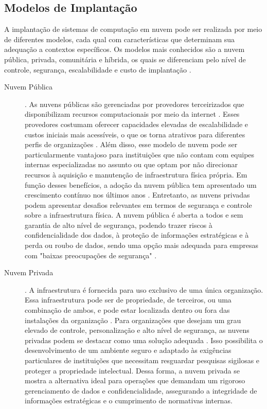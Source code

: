 \subsection{Modelos de Implantação}

A implantação de sistemas de computação em nuvem pode ser realizada por meio de diferentes modelos, cada qual com características que determinam sua adequação a contextos específicos. Os modelos mais conhecidos são a nuvem pública, privada, comunitária e híbrida, os quais se diferenciam pelo nível de controle, segurança, escalabilidade e custo de implantação \cite{mell2011}.

\begin{description}
    \item[Nuvem Pública]. As nuvens públicas são gerenciadas por provedores terceirizados que disponibilizam recursos computacionais por meio da internet \cite{carroll2011}. Esses provedores costumam oferecer capacidades elevadas de escalabilidade e custos iniciais mais acessíveis, o que os torna atrativos para diferentes perfis de organizações \cite{amajuoyi2024}. Além disso, esse modelo de nuvem pode ser particularmente vantajoso para instituições que não contam com equipes internas especializadas no assunto ou que optam por não direcionar recursos à aquisição e manutenção de infraestrutura física própria. Em função desses benefícios, a adoção da nuvem pública tem apresentado um crescimento contínuo nos últimos anos \cite{amajuoyi2024}. Entretanto, as nuvens privadas podem apresentar desafios relevantes em termos de segurança e controle sobre a infraestrutura física. A nuvem pública é aberta a todos e sem garantia de alto nível de segurança, podendo trazer riscos à confidencialidade dos dados, à proteção de informações estratégicas e à perda ou roubo de dados, sendo uma opção mais adequada para empresas com "baixas preocupações de segurança" \cite{sathya2023}.
    \item[Nuvem Privada]. A infraestrutura é fornecida para uso exclusivo de uma única organização. Essa infraestrutura pode ser de propriedade, de terceiros, ou uma combinação de ambos, e pode estar localizada dentro ou fora das instalações da organização \cite{mell2011}. Para organizações que desejam um grau elevado de controle, personalização e alto nível de segurança, as nuvens privadas podem se destacar como uma solução adequada \cite{swapna2023}. Isso possibilita o desenvolvimento de um ambiente seguro e adaptado às exigências particulares de instituições que necessitam resguardar pesquisas sigilosas e proteger a propriedade intelectual. Dessa forma, a nuvem privada se mostra a alternativa ideal para operações que demandam um rigoroso gerenciamento de dados e confidencialidade, assegurando a integridade de informações estratégicas e o cumprimento de normativas internas.

\end{description}
